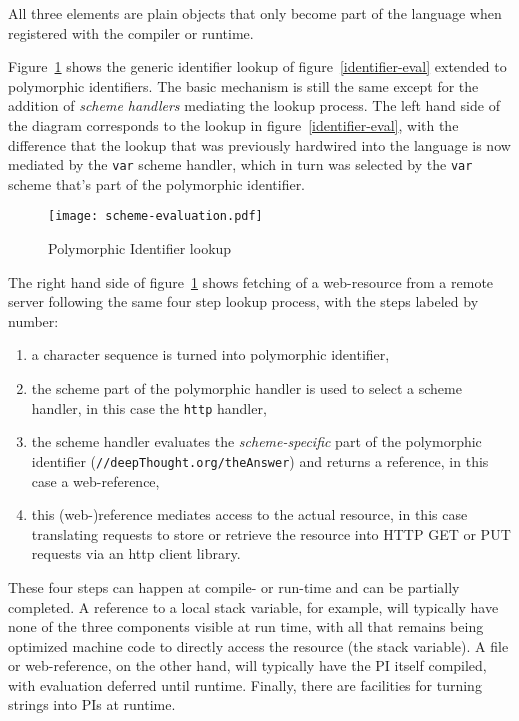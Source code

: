 \documentclass[preprint,authoryear]{acm_proc_article-sp}
\begin{document}
All three elements are plain objects that only become part of the language when registered
with the compiler or runtime.

Figure~\ref{scheme-eval} shows the generic identifier lookup of figure~\ref{identifier-eval}
extended to polymorphic identifiers.  The basic mechanism is still the same except for the
addition of {\em scheme handlers} mediating the lookup process.  The left hand side of the
diagram corresponds to the lookup in figure~\ref{identifier-eval}, with the difference that
the lookup that was previously hardwired into the language is now mediated by the {\tt var}
scheme handler, which in turn was selected by the {\tt var} scheme that's part of the 
polymorphic identifier.


\begin{figure}[htbp]
\begin{center}
\texttt{[image: scheme-evaluation.pdf]}
\caption{Polymorphic Identifier lookup}
\label{scheme-eval}
\end{center}
\end{figure}


The right hand side of figure~\ref{scheme-eval} shows fetching of a web-resource from
a remote server following the same four step lookup process, with the steps labeled by
number:

\begin{enumerate}
\item a character sequence is turned into  polymorphic identifier,
\item the scheme part of the polymorphic handler is used to select a scheme handler, in this case the {\tt http} handler,
\item the scheme handler evaluates the {\em scheme-specific} part of the polymorphic identifier ({\tt //deepThought.org/theAnswer})
	 and returns a reference, in this case a web-reference,
\item this (web-)reference mediates access to the actual resource, in this case translating requests to store or retrieve the 
	resource into HTTP GET or PUT requests via an http client library.
\end{enumerate}

These four steps can happen at compile- or run-time and can be partially completed.
A reference to a local stack variable, for example, will typically have none of the
three components visible at run time, with all that remains being optimized 
machine code to directly access the resource (the stack variable).
A file or web-reference, on the other hand, will typically have the PI itself
compiled, with evaluation deferred until runtime.  Finally, there are facilities
for turning strings into PIs at runtime.
\end{document}
